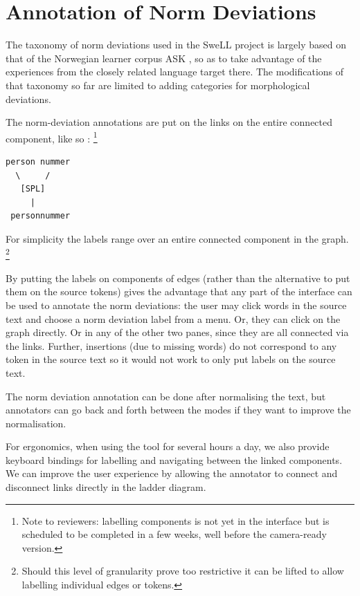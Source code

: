 \documentclass[10pt, a4paper]{article}
\newcommand{\dan}[1]{{\color{Fuchsia}{Dan: #1}}}
\newcommand{\elena}[1]{{\color{BrickRed}{Elena: #1}}}
\newcommand{\mats}[1]{{\color{Blue}{Mats: #1}}}
\begin{document}
\section{Annotation of Norm Deviations}
\label{sec:ann_tool}


The taxonomy of norm deviations used in the SweLL project is largely based
on that of the Norwegian learner corpus ASK \cite{tenfjord2006ask},
so as to take advantage of the experiences from the closely related language
target there.
The modifications of that taxonomy so far are limited to adding categories
for morphological deviations.

\mats{Clarify if this is about what is added graphically
by the annotator or if it is about the representation, or both.}

The norm-deviation annotations are put on the links
on the entire connected component, like so \dan{in ascii art for now}:
\footnote{Note to reviewers: labelling components is not yet in the interface
but is scheduled to be completed in a few weeks, well before the camera-ready
version.}

\begin{verbatim}
person nummer
  \     /
   [SPL]
     |
 personnummer
\end{verbatim}

For simplicity the labels range over an entire connected
component in the graph.
\footnote{Should this level of granularity prove too restrictive
it can be lifted to allow labelling individual edges or tokens.}

By putting the labels on components of edges
(rather than the alternative to put them on the source tokens) gives the advantage that any part of the interface can be used to annotate the norm deviations:
the user may click words in the source text and choose a norm deviation label from a menu. Or, they can click on the graph directly. Or in any of the other two panes,
since they are all connected via the links.
Further, insertions (due to missing words) do not correspond to any token in the source text so it would not work to only put labels on the source text.

The norm deviation annotation can be done after normalising the text, but annotators can go back and forth between the modes
if they want to improve the normalisation.

For ergonomics, when using the tool for several hours a day,
we also provide keyboard bindings for labelling and navigating between
the linked components.
We can improve the user experience by allowing the annotator to connect
and disconnect links directly in the ladder diagram.
\end{document}
